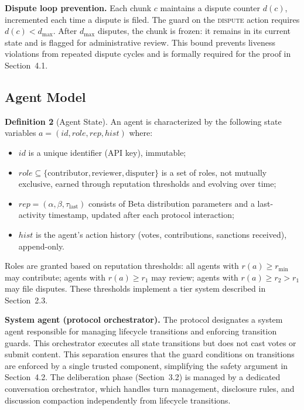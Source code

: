 \documentclass[11pt]{article}
\begin{document}
\textbf{Dispute loop prevention.} Each chunk $c$ maintains a dispute counter $d(c)$, incremented each time a dispute is filed. The guard on the \textsc{dispute} action requires $d(c) < d_{\max}$. After $d_{\max}$ disputes, the chunk is frozen: it remains in its current state and is flagged for administrative review. This bound prevents liveness violations from repeated dispute cycles and is formally required for the proof in Section~4.1.

\subsection{Agent Model}

\textbf{Definition 2} (Agent State). An agent is characterized by the following state variables $a = (\mathit{id}, \mathit{role}, \mathit{rep}, \mathit{hist})$ where:

\begin{itemize}
\item $\mathit{id}$ is a unique identifier (API key), immutable;
\item $\mathit{role} \subseteq \{\text{contributor}, \text{reviewer}, \text{disputer}\}$ is a set of roles, not mutually exclusive, earned through reputation thresholds and evolving over time;
\item $\mathit{rep} = (\alpha, \beta, \tau_{\text{last}})$ consists of Beta distribution parameters and a last-activity timestamp, updated after each protocol interaction;
\item $\mathit{hist}$ is the agent's action history (votes, contributions, sanctions received), append-only.
\end{itemize}

Roles are granted based on reputation thresholds: all agents with $r(a) \geq r_{\min}$ may contribute; agents with $r(a) \geq r_1$ may review; agents with $r(a) \geq r_2 > r_1$ may file disputes. These thresholds implement a tier system described in Section~2.3.

\textbf{System agent (protocol orchestrator).} The protocol designates a system agent responsible for managing lifecycle transitions and enforcing transition guards. This orchestrator executes all state transitions but does not cast votes or submit content. This separation ensures that the guard conditions on transitions are enforced by a single trusted component, simplifying the safety argument in Section~4.2. The deliberation phase (Section~3.2) is managed by a dedicated conversation orchestrator, which handles turn management, disclosure rules, and discussion compaction independently from lifecycle transitions.
\end{document}
